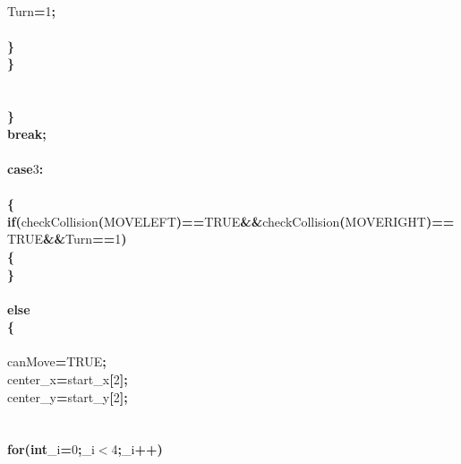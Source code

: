 \documentclass[a4paper, 10pt]{article}
\newcommand\SPC{\hspace*{0.6em}}
\newcommand{\CppAIdentifier}[1]{#1}
\newcommand{\CppANumber}[1]{\textcolor[rgb]{0.5,0,0.5}{#1}}
\newcommand{\CppAReservedWord}[1]{\textbf{#1}}
\newcommand{\CppASpace}[1]{\colorbox[rgb]{1,1,1}{#1}}
\newcommand{\CppASymbol}[1]{\textbf{\textcolor[rgb]{1,0,0}{#1}}}
\begin{document}
\begin{ttfamily}
\\
\CppASpace{\SPC \SPC \SPC \SPC \SPC }\CppAIdentifier{Turn}\CppASpace{\SPC }\CppASymbol{=}\CppASpace{\SPC }\CppANumber{1}\CppASymbol{;}\\
\\
\CppASpace{\SPC \SPC \SPC \SPC }\CppASymbol{\}}\\
\CppASpace{\SPC \SPC \SPC }\CppASymbol{\}}\\
\\
\\
\CppASpace{\SPC \SPC }\CppASymbol{\}}\\
\CppASpace{\SPC \SPC }\CppAReservedWord{break}\CppASymbol{;}\\
\\
\CppASpace{\SPC \SPC }\CppAReservedWord{case}\CppASpace{\SPC }\CppANumber{3}\CppASymbol{:}\\
\\
\CppASpace{\SPC \SPC }\CppASymbol{\{}\\
\CppASpace{\SPC \SPC \SPC }\CppAReservedWord{if}\CppASymbol{(}\CppAIdentifier{checkCollision}\CppASymbol{(}\CppAIdentifier{MOVELEFT}\CppASymbol{)}\CppASymbol{==}\CppAIdentifier{TRUE}\CppASymbol{\&\&}\CppAIdentifier{checkCollision}\CppASymbol{(}\CppAIdentifier{MOVERIGHT}\CppASymbol{)}\CppASymbol{==}\CppAIdentifier{TRUE}\CppASymbol{\&\&}\CppAIdentifier{Turn}\CppASymbol{==}\CppANumber{1}\CppASymbol{)}\\
\CppASpace{\SPC \SPC \SPC }\CppASymbol{\{}\\
\CppASpace{\SPC \SPC \SPC }\CppASymbol{\}}\\
\\
\CppASpace{\SPC \SPC \SPC }\CppAReservedWord{else}\\
\CppASpace{\SPC \SPC \SPC }\CppASymbol{\{}\\
\\
\CppASpace{\SPC \SPC \SPC \SPC }\CppAIdentifier{canMove}\CppASymbol{=}\CppAIdentifier{TRUE}\CppASymbol{;}\\
\CppASpace{\SPC \SPC \SPC \SPC }\CppAIdentifier{center\_x}\CppASymbol{=}\CppAIdentifier{start\_x}\CppASymbol{[}\CppANumber{2}\CppASymbol{]}\CppASymbol{;}\\
\CppASpace{\SPC \SPC \SPC \SPC }\CppAIdentifier{center\_y}\CppASymbol{=}\CppAIdentifier{start\_y}\CppASymbol{[}\CppANumber{2}\CppASymbol{]}\CppASymbol{;}\\
\\
\\
\CppASpace{\SPC \SPC \SPC \SPC }\CppAReservedWord{for}\CppASymbol{(}\CppAReservedWord{int}\CppASpace{\SPC }\CppAIdentifier{\_i}\CppASymbol{=}\CppANumber{0}\CppASymbol{;}\CppAIdentifier{\_i}\CppASymbol{$<$}\CppANumber{4}\CppASymbol{;}\CppAIdentifier{\_i}\CppASymbol{++}\CppASymbol{)}\\

\end{ttfamily}
\end{document}
